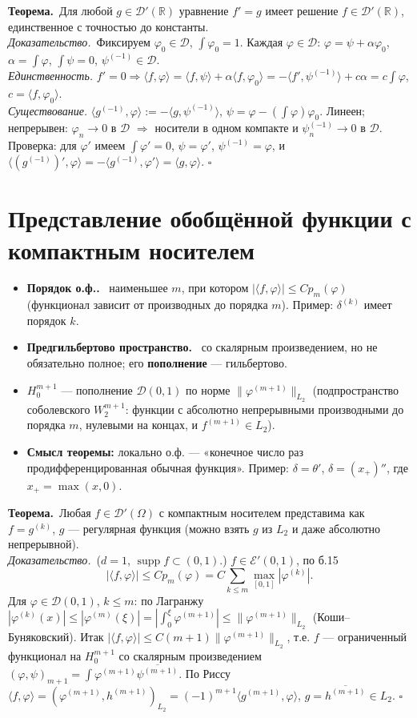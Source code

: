 \documentclass[11pt,a4paper]{article}
\newcommand{\RR}{\mathbb R}
\newcommand{\DD}{\mathcal D}
\newcommand{\EE}{\mathcal E}
\newcommand{\supp}{\operatorname{supp}}
\newcommand{\df}[1]{\textbf{#1.}~}
\newcommand{\thm}{\textbf{Теорема.}~}
\newcommand{\pf}{\textit{Доказательство.}~}
\newcommand{\qedd}{\hfill$\square$}
\begin{document}
\thm Для любой $g\in\DD'(\RR)$ уравнение $f'=g$ имеет решение $f\in\DD'(\RR)$, единственное с точностью до константы.\\
\pf Фиксируем $\varphi_0\in\DD$, $\int\varphi_0=1$. Каждая $\varphi\in\DD$: $\varphi=\psi+\alpha\varphi_0$, $\alpha=\int\varphi$, $\int\psi=0$, $\psi^{(-1)}\in\DD$.\\
\textit{Единственность.} $f'=0\Rightarrow\langle f,\varphi\rangle=\langle f,\psi\rangle+\alpha\langle f,\varphi_0\rangle=-\langle f',\psi^{(-1)}\rangle+c\alpha=c\int\varphi$, $c=\langle f,\varphi_0\rangle$.\\
\textit{Существование.} $\langle g^{(-1)},\varphi\rangle:=-\langle g,\psi^{(-1)}\rangle$, $\psi=\varphi-(\int\varphi)\varphi_0$. Линеен; непрерывен: $\varphi_n\to0$ в $\DD$ $\Rightarrow$ носители в одном компакте и $\psi_n^{(-1)}\to0$ в $\DD$. Проверка: для $\varphi'$ имеем $\int\varphi'=0$, $\psi=\varphi'$, $\psi^{(-1)}=\varphi$, и $\langle(g^{(-1)})',\varphi\rangle=-\langle g^{(-1)},\varphi'\rangle=\langle g,\varphi\rangle$. \qedd

\section{Представление обобщённой функции с компактным носителем}
\begin{defs}
\begin{itemize}
\item \df{Порядок о.ф.} наименьшее $m$, при котором $|\langle f,\varphi\rangle|\le Cp_m(\varphi)$ (функционал зависит от производных до порядка $m$). Пример: $\delta^{(k)}$ имеет порядок $k$.
\item \df{Предгильбертово пространство} со скалярным произведением, но не обязательно полное; его \textbf{пополнение} — гильбертово.
\item $H_0^{m+1}$ — пополнение $\DD(0,1)$ по норме $\|\varphi^{(m+1)}\|_{L_2}$ (подпространство соболевского $W_2^{m+1}$: функции с абсолютно непрерывными производными до порядка $m$, нулевыми на концах, и $f^{(m+1)}\in L_2$).
\item \textbf{Смысл теоремы:} локально о.ф. — «конечное число раз продифференцированная обычная функция». Пример: $\delta=\theta'$, $\delta=(x_+)''$, где $x_+=\max(x,0)$.
\end{itemize}
\end{defs}

\thm Любая $f\in\DD'(\Omega)$ с компактным носителем представима как $f=g^{(k)}$, $g$ — регулярная функция (можно взять $g$ из $L_2$ и даже абсолютно непрерывной).\\
\pf ($d=1$, $\supp f\subset(0,1)$.) $f\in\EE'(0,1)$, по б.15
\[|\langle f,\varphi\rangle|\le Cp_m(\varphi)=C\sum_{k\le m}\max_{[0,1]}|\varphi^{(k)}|.\]
Для $\varphi\in\DD(0,1)$, $k\le m$: по Лагранжу $|\varphi^{(k)}(x)|\le|\varphi^{(m)}(\xi)|=|\int_0^\xi\varphi^{(m+1)}|\le\|\varphi^{(m+1)}\|_{L_2}$ (Коши–Буняковский). Итак $|\langle f,\varphi\rangle|\le C(m+1)\|\varphi^{(m+1)}\|_{L_2}$, т.е. $f$ — ограниченный функционал на $H_0^{m+1}$ со скалярным произведением $(\varphi,\psi)_{m+1}=\int\varphi^{(m+1)}\overline{\psi^{(m+1)}}$. По Риссу $\langle f,\varphi\rangle=(\varphi^{(m+1)},h^{(m+1)})_{L_2}=(-1)^{m+1}\langle g^{(m+1)},\varphi\rangle$, $g=\overline{h^{(m+1)}}\in L_2$. \qedd
\end{document}
